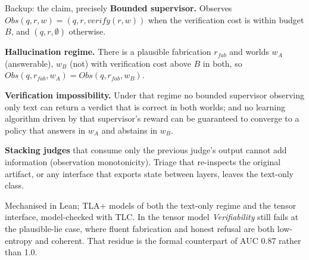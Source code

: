 \documentclass[aspectratio=169,10pt]{beamer}
\begin{document}
\appendix
\begin{frame}{Backup: the claim, precisely}
  \footnotesize
  \textbf{Bounded supervisor.} Observes $Obs(q,r,w) = (q, r, \mathit{verify}(r,w))$
  when the verification cost is within budget $B$, and $(q, r, \emptyset)$ otherwise.

  \vspace{0.4em}
  \textbf{Hallucination regime.} There is a plausible fabrication $r_{fab}$ and
  worlds $w_A$ (answerable), $w_B$ (not) with verification cost above $B$ in both,
  so $Obs(q, r_{fab}, w_A) = Obs(q, r_{fab}, w_B)$.

  \vspace{0.4em}
  \textbf{Verification impossibility.} Under that regime no bounded supervisor
  observing only text can return a verdict that is correct in both worlds; and
  no learning algorithm driven by that supervisor's reward can be guaranteed to
  converge to a policy that answers in $w_A$ and abstains in $w_B$.

  \vspace{0.4em}
  \textbf{Stacking judges} that consume only the previous judge's output cannot
  add information (observation monotonicity). Triage that re-inspects the
  original artifact, or any interface that exports state between layers, leaves
  the text-only class.

  \vspace{0.4em}
  Mechanised in Lean; TLA+ models of both the text-only regime and the tensor
  interface, model-checked with TLC. In the tensor model \emph{Verifiability}
  still fails at the plausible-lie case, where fluent fabrication and honest
  refusal are both low-entropy and coherent. That residue is the formal
  counterpart of AUC 0.87 rather than 1.0.
\end{frame}
\end{document}
